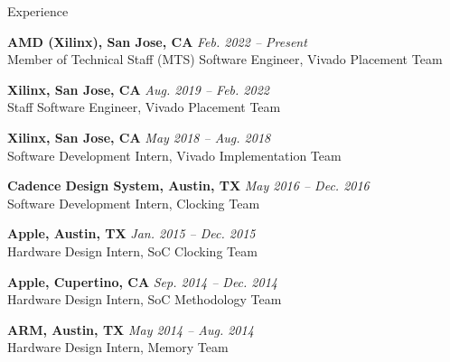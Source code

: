 
\begin{rSection}{Experience}


{\bf AMD (Xilinx), San Jose, CA} \hfill {\em Feb. 2022 -- Present} \\
Member of Technical Staff (MTS) Software Engineer, Vivado Placement Team

{\bf Xilinx, San Jose, CA} \hfill {\em Aug. 2019 -- Feb. 2022} \\
Staff Software Engineer, Vivado Placement Team

{\bf Xilinx, San Jose, CA} \hfill {\em May 2018 -- Aug. 2018} \\
Software Development Intern, Vivado Implementation Team
    
{\bf Cadence Design System, Austin, TX} \hfill {\em May 2016 -- Dec. 2016} \\
Software Development Intern, Clocking Team

{\bf Apple, Austin, TX} \hfill {\em Jan. 2015 -- Dec. 2015} \\
Hardware Design Intern, SoC Clocking Team

{\bf Apple, Cupertino, CA} \hfill {\em Sep. 2014 -- Dec. 2014} \\
Hardware Design Intern, SoC Methodology Team

{\bf ARM, Austin, TX} \hfill {\em May 2014 -- Aug. 2014} \\
Hardware Design Intern, Memory Team


\end{rSection}


